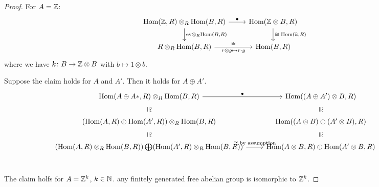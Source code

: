 \documentclass[language=english]{TemplateLecture}
\begin{document}
\begin{proof}
    For \(A = \mathbb{Z}\):
    \[\begin{tikzcd}
        {\Hom(\IZ,R) \otimes_R \Hom(B,R)} \ar[r, "\bullet"] \ar[d, "{\mathrm{ev} \otimes_R \Hom(B,R)}"] & {\Hom(\IZ\otimes B, R)} \ar[d, "{\cong \; \Hom(k,R)}"]\\
        {R \otimes_R \Hom(B,R)} \ar[r, "\cong", "r\otimes g \mapsto r\cdot g"'] & {\Hom(B,R)}
    \end{tikzcd}\]
    where we have \(k \colon B \to \mathbb{Z} \otimes B\) with \(b\mapsto 1 \otimes b\).

    Suppose the claim holds for \(A\) and \(A'\). Then it holds for \(A \oplus A'\).
    \[\begin{tikzcd}
        {\Hom(A\oplus A*, R) \otimes_R \Hom(B,R)} \ar[r, "\bullet"] \ar[d, phantom, sloped, "\cong"]& {\Hom((A\oplus A') \otimes B, R)} \ar[d, phantom, sloped, "\cong"] \\
        {(\Hom(A,R) \oplus \Hom(A',R)) \otimes_R \Hom(B,R)} \ar[d, phantom, sloped, "\cong"] & {\Hom((A\otimes B) \oplus (A' \otimes B), R)} \ar[d, phantom, sloped, "\cong"]\\
        {(\Hom(A,R) \otimes_R \Hom(B,R)) \bigoplus (\Hom(A',R) \otimes_R \Hom(B,R))} \ar[r, "\cong \; \text{by assumption}"]&  {\Hom(A\otimes B, R) \oplus \Hom(A' \otimes B, R)} &\\
    \end{tikzcd}\]

    The claim holfs for \(A = \mathbb{Z}^k\), \(k \in \mathbb{N}\). any finitely generated free abelian group is isomorphic to \(\mathbb{Z}^k\).
\end{proof}
\end{document}
